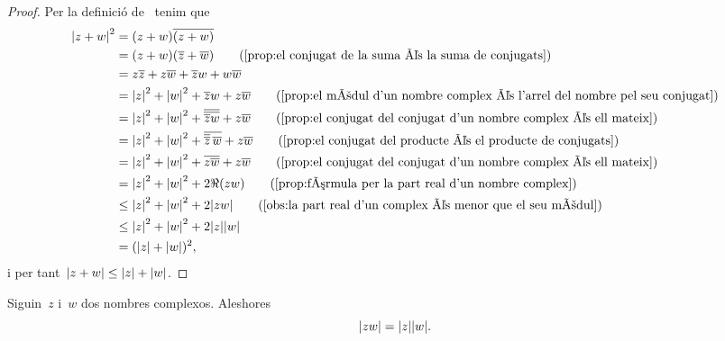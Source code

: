\documentclass[../Apunts.tex]{subfiles}
\begin{document}
    \begin{proof}
        Per la definició de~ tenim que
        \begin{align*}
            \modul{z+w}^{2}&=(z+w)\conjugat{(z+w)} \\
            &=(z+w)(\conjugat{z}+\conjugat{w})
            \tag{\ref{prop:el conjugat de la suma és la suma de conjugats}} \\
            &=z\conjugat{z}+z\conjugat{w}+\conjugat{z}w+w\conjugat{w} \\
            &=\modul{z}^{2}+\modul{w}^{2}+\conjugat{z}w+z\conjugat{w}
            \tag{\ref{prop:el mòdul d'un nombre complex és l'arrel del nombre %
            pel seu conjugat}} \\
            &=\modul{z}^{2}+\modul{w}^{2}+\conjugat{\conjugat{\conjugat{z}w}}
            +z\conjugat{w} \tag{\ref{prop:el conjugat del conjugat d'un nombre %
            complex és ell mateix}} \\
            &=\modul{z}^{2}+\modul{w}^{2}+\conjugat{\conjugat{\conjugat{z}}\,
            \conjugat{w}}+z\conjugat{w} \tag{\ref{prop:el conjugat del %
            producte és el producte de conjugats}} \\
            &=\modul{z}^{2}+\modul{w}^{2}+\conjugat{z\conjugat{w}}+z\conjugat{w}
            \tag{\ref{prop:el conjugat del conjugat d'un nombre complex és %
            ell mateix}} \\
            &=\modul{z}^{2}+\modul{w}^{2}+2\Re(zw)
            \tag{\ref{prop:fórmula per la part real d'un nombre complex}} \\
            &\leq\modul{z}^{2}+\modul{w}^{2}+2\modul{zw}
            \tag{\ref{obs:la part real d'un complex és menor que el seu mòdul}}\\
            &\leq\modul{z}^{2}+\modul{w}^{2}+2\modul{z}\modul{w} \\
            &=(\modul{z}+\modul{w})^{2},
        \end{align*}
        i per tant~\(\modul{z+w}\leq\modul{z}+\modul{w}\).
    \end{proof}
    \begin{proposition}
        \label{prop:el producte de mòduls és el mòdul del producte}
        Siguin~\(z\) i~\(w\) dos nombres complexos.
        Aleshores
        \[\modul{zw}=\modul{z}\modul{w}.\]
    \end{proposition}
\end{document}
